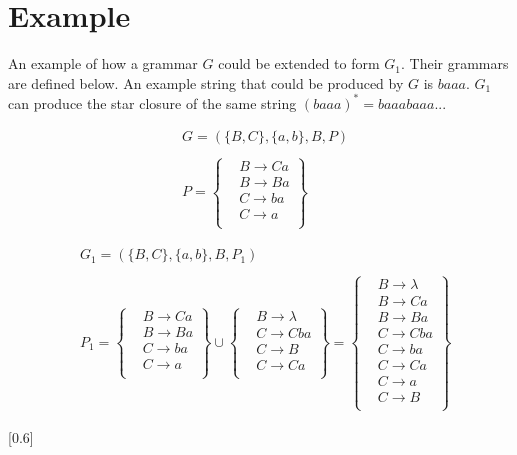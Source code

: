 \documentclass{assignment-x}
\theoremstyle{definition}
\theoremstyle{remark}
\begin{document}
\section{Example}
An example of how a grammar $G$ could be extended to form $G_1$. Their grammars are defined below. An example string that could be produced by $G$ is $baaa$. $G_1$ can produce the star closure of the same string $(baaa)^* = baaabaaa...$


\begin{multicols}{2}
\begin{align*}
    &G  = (\{B,C\},\{a,b\},B,P) \\ \\
    &P = 
    \left\{
    \begin{aligned}
    &B \rightarrow Ca \\
    &B \rightarrow Ba \\
    &C \rightarrow ba \\
    &C \rightarrow a \\
    \end{aligned}
    \right\}
\end{align*}
\columnbreak

\begin{align*}
    &G_1  = (\{B,C\},\{a,b\},B,P_1) \\ \\
    &P_1 = 
    \left\{
    \begin{aligned}
    &B \rightarrow Ca \\
    &B \rightarrow Ba \\
    &C \rightarrow ba \\
    &C \rightarrow a \\
    \end{aligned}
    \right\} 
    \cup
    \left\{
    \begin{aligned}
    &B \rightarrow \lambda \\
    &C \rightarrow Cba \\
    &C \rightarrow B \\
    &C \rightarrow Ca \\
    \end{aligned}
    \right\}
    =
    \left\{
        \begin{aligned}
        &B \rightarrow \lambda \\
        &B \rightarrow Ca \\
        &B \rightarrow Ba \\
        &C \rightarrow Cba \\
        &C \rightarrow ba \\
        &C \rightarrow Ca \\
        &C \rightarrow a \\
        &C \rightarrow B \\
        \end{aligned}
        \right\}
\end{align*}
\end{multicols}

[0.6\linewidth]
\end{document}

